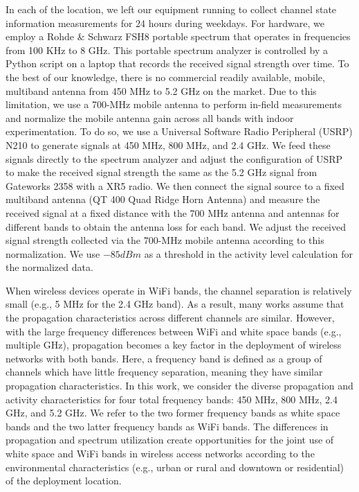 In each of the location, we left our equipment running to collect channel state information measurements for 24 hours during weekdays. 
For hardware, we employ a Rohde \& Schwarz FSH8 portable spectrum that operates in frequencies from 100 KHz to 8 GHz. 
This portable spectrum analyzer is controlled by a Python script on a laptop that records the received signal strength over time.
To the best of our knowledge, there is no commercial readily available, mobile, multiband antenna from 450 MHz to 5.2 GHz on the market. 
Due to this limitation, we use a 700-MHz mobile antenna to perform in-field measurements and normalize the mobile antenna gain across all bands with indoor experimentation. 
To do so, we use a Universal Software Radio Peripheral (USRP) N210 to generate signals at 450 MHz, 800 MHz, and 2.4 GHz. 
We feed these signals directly to the spectrum analyzer and adjust the configuration of USRP to make the received signal strength the same as the 5.2 GHz signal from Gateworks 2358 with a XR5 radio. 
We then connect the signal source to a fixed multiband antenna (QT 400 Quad Ridge Horn Antenna) and measure the received signal at a fixed distance with the 700 MHz antenna and antennas for different bands to obtain the antenna loss for each band. 
We adjust the received signal strength collected via the 700-MHz mobile antenna according to this normalization.
We use $-85 dBm$ as a threshold in the activity level calculation for the normalized data.

When wireless devices operate in WiFi bands, the channel separation is relatively small (e.g., 5 MHz for the 2.4 GHz band). 
As a result, many works assume that the propagation characteristics across different channels are similar. 
However, with the large frequency differences between WiFi and white space bands (e.g., multiple GHz), propagation becomes a key factor in the deployment of wireless networks with both bands.
Here, a frequency band is defined as a group of channels which have little frequency separation, meaning they have similar propagation characteristics.
In this work, we consider the diverse propagation and activity characteristics for four total frequency bands: 450 MHz, 800 MHz, 2.4 GHz, and 5.2 GHz.
We refer to the two former frequency bands as white space bands and the two latter frequency bands as WiFi bands.
The differences in propagation and spectrum utilization create opportunities for the joint use of white space and WiFi bands in wireless access networks according to the environmental characteristics (e.g., urban or rural and downtown or residential) of the deployment location.


